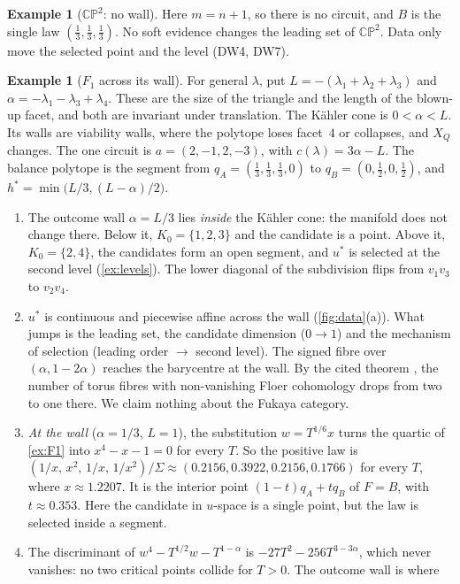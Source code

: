 \documentclass[11pt]{article}
\theoremstyle{definition}\newtheorem{definition}[theorem]{Definition}\newtheorem{remark}[theorem]{Remark}\newtheorem{example}[theorem]{Example}\newtheorem{problem}[theorem]{Open problem}\crefname{problem}{Problem}{Problems}
\begin{document}
\begin{example}[$\mathbb{CP}^2$: no wall]
Here $m=n+1$, so there is no circuit, and $B$ is the single law $(\tfrac13,\tfrac13,\tfrac13)$. No soft evidence changes the leading set of $\mathbb{CP}^2$. Data only move the selected point and the level
(DW4, DW7).
\end{example}

\begin{example}[$F_1$ across its wall]\label{ex:F1wall}
For general $\lambda$, put $L=-(\lambda_1+\lambda_2+\lambda_3)$ and $\alpha=-\lambda_1-\lambda_3+\lambda_4$. These are the size of the triangle and the length of the blown-up facet, and both are
invariant under translation. The K\"ahler cone is $0<\alpha<L$. Its walls are viability walls, where the polytope loses facet~$4$ or collapses, and $X_Q$ changes.
The one circuit is $a=(2,-1,2,-3)$, with $c(\lambda)=3\alpha-L$. The balance polytope is the segment from $q_A=(\tfrac13,\tfrac13,\tfrac13,0)$ to $q_B=(0,\tfrac12,0,\tfrac12)$, and $h^*=\min\bigl(L/3,(L-\alpha)/2\bigr)$.
\begin{enumerate}
\item[(a)] The outcome wall $\alpha=L/3$ lies \emph{inside} the K\"ahler cone: the manifold does not change there. Below it, $K_0=\{1,2,3\}$ and the candidate is a point.
  Above it, $K_0=\{2,4\}$, the candidates form an open segment, and $u^*$ is selected at the second level (\cref{ex:levels}). The lower diagonal of the subdivision flips from $v_1v_3$ to $v_2v_4$.
\item[(b)] $u^*$ is continuous and piecewise affine across the wall (\cref{fig:data}(a)). What jumps is the leading set, the candidate dimension ($0\to1$) and the mechanism of
  selection (leading order $\to$ second level). The signed fibre over $(\alpha,1-2\alpha)$ reaches the barycentre at the wall. By the cited theorem \cite{ChoOh2006}, the number of
  torus fibres with non-vanishing Floer cohomology drops from two to one there. We claim nothing about the Fukaya category.
\item[(c)] \emph{At the wall} ($\alpha=1/3$, $L=1$), the substitution $w=T^{1/6}x$ turns the quartic of \cref{ex:F1} into $x^4-x-1=0$ for every $T$. So the positive law is
  $(1/x,\,x^2,\,1/x,\,1/x^2)/\Sigma\approx(0.2156,0.3922,0.2156,0.1766)$ for every $T$, where $x\approx1.2207$. It is the interior point $(1-t)q_A+tq_B$ of $F=B$, with $t\approx0.353$. Here the candidate in
  $u$-space is a single point, but the law is selected inside a segment.
\item[(d)] The discriminant of $w^4-T^{1/2}w-T^{1-\alpha}$ is $-27T^2-256T^{3-3\alpha}$, which never vanishes: no two critical points collide for $T>0$. The outcome wall is where

\end{enumerate}
\end{example}
\end{document}
